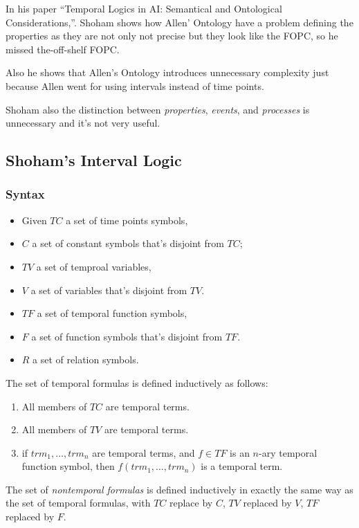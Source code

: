In his paper ``Temporal Logics in AI: Semantical and Ontological Considerations,''\cite{shoham1988temporal}.
Shoham shows how Allen' Ontology have a problem defining the properties as they are not only not precise but they look like the FOPC, so he missed the-off-shelf FOPC.

Also he shows that Allen's Ontology introduces unnecessary complexity just because Allen went for using intervals instead of time points.

Shoham also the distinction between \textit{properties}, \textit{events}, and \textit{processes} is unnecessary and it's not very useful.


\subsection{Shoham's Interval Logic}
\subsubsection{Syntax}
\begin{itemize}
	\item Given $TC$ a set of time points symbols,
	\item $C$ a set of constant symbols that's disjoint from $TC$;
	\item $TV$ a set of temproal variables,
	\item $V$ a set of variables that's disjoint from $TV$.
	\item $TF$ a set of temporal function symbols,
	\item $F$ a set of function symbols that's disjoint from $TF$.
	\item $R$ a set of relation symbols.
\end{itemize}

The set of temporal formulas is defined inductively as follows:
\begin{enumerate}
	\item All members of $TC$ are temporal terms.
	\item All members of $TV$ are temporal terms.
	\item if $trm_1, \dots, trm_n$ are temporal terms, and $f \in TF$ is an $n$-ary temporal function symbol, then $f(trm_1, \dots, trm_n)$ is a temporal term.
\end{enumerate}

The set of \textit{nontemporal formulas} is defined inductively in exactly the same way as the set of temporal formulas, with
$TC$ replace by $C$, $TV$ replaced by $V$, $TF$ replaced by $F$.

